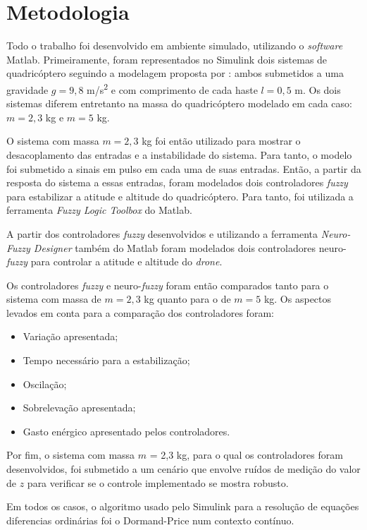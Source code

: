 \chapter{Metodologia}
\label{chap:metodologia}

Todo o trabalho foi desenvolvido em ambiente simulado, utilizando o \textit{software} Matlab\textsuperscript{\textregistered}. Primeiramente, foram representados no Simulink\textsuperscript{\textregistered} dois sistemas de quadricóptero seguindo a modelagem proposta por : ambos submetidos a uma gravidade $g = 9,8$ m/s\textsuperscript{2} e com comprimento de cada haste $l = 0,5$ m. Os dois sistemas diferem entretanto na massa do quadricóptero modelado em cada caso: $m = 2,3$ kg e $m = 5$ kg.

O sistema com massa $m = 2,3$ kg foi então utilizado para mostrar o desacoplamento das entradas e a instabilidade do sistema. Para tanto, o modelo foi submetido a sinais em pulso em cada uma de suas entradas. Então, a partir da resposta do sistema a essas entradas, foram modelados dois controladores \textit{fuzzy} para estabilizar a atitude e altitude do quadricóptero. Para tanto, foi utilizada a ferramenta \textit{Fuzzy Logic Toolbox} do Matlab\textsuperscript{\textregistered}.

A partir dos controladores \textit{fuzzy} desenvolvidos e utilizando a ferramenta \textit{Neuro-Fuzzy Designer} também do Matlab\textsuperscript{\textregistered} foram modelados dois controladores neuro-\textit{fuzzy} para controlar a atitude e altitude do \textit{drone}.

Os controladores \textit{fuzzy} e neuro-\textit{fuzzy} foram então comparados tanto para o sistema com massa de $m = 2,3$ kg quanto para o de $m = 5$ kg. Os aspectos levados em conta para a comparação dos controladores foram:
\begin{itemize}
	\item Variação apresentada;
	\item Tempo necessário para a estabilização;
	\item Oscilação;
	\item Sobrelevação apresentada;
	\item Gasto enérgico apresentado pelos controladores.
\end{itemize}

Por fim, o sistema com massa $m$ = 2,3 kg, para o qual os controladores foram desenvolvidos, foi submetido a um cenário que envolve ruídos de medição do valor de $z$ para verificar se o controle implementado se mostra robusto.

Em todos os casos, o algoritmo usado pelo Simulink\textsuperscript{\textregistered} para a resolução de equações diferencias ordinárias foi o Dormand-Price num contexto contínuo.
